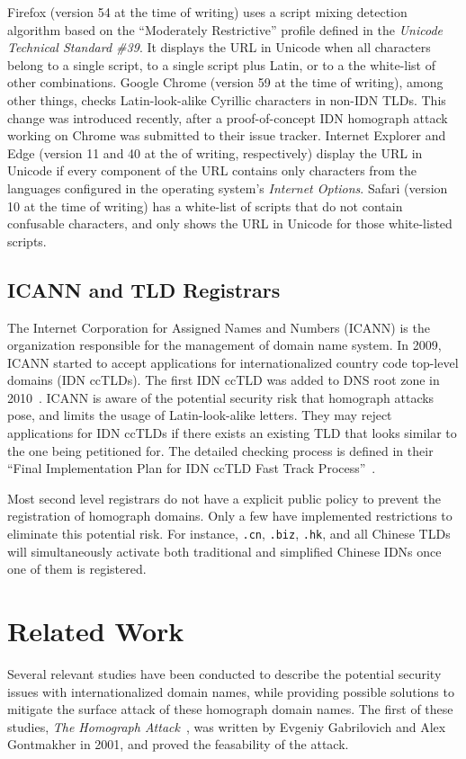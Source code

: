\documentclass[letterpaper,twocolumn,10pt]{article}
\begin{document}
Firefox (version 54 at the time of writing) uses a script mixing detection algorithm based on the ``Moderately Restrictive'' profile defined in the \textit{Unicode Technical Standard \#39}.
It displays the URL in Unicode when all characters belong to a single script, to a single script plus Latin, or to a the white-list of other combinations.
Google Chrome (version 59 at the time of writing), among other things, checks Latin-look-alike Cyrillic characters in non-IDN TLDs.
This change was introduced recently, after a proof-of-concept IDN homograph attack working on Chrome was submitted to their issue tracker.
Internet Explorer and Edge (version 11 and 40 at the of writing, respectively) display the URL in Unicode if every component of the URL contains only characters from the languages configured in the operating system's \textit{Internet Options}.
Safari (version 10 at the time of writing) has a white-list of scripts that do not contain confusable characters, and only shows the URL in Unicode for those white-listed scripts.

\subsection{ICANN and TLD Registrars}
The Internet Corporation for Assigned Names and Numbers (ICANN) is the organization responsible for the management of domain name system.
In 2009, ICANN started to accept applications for internationalized country code top-level domains (IDN ccTLDs).
The first IDN ccTLD was added to DNS root zone in 2010~\cite{mac2010}.
ICANN is aware of the potential security risk that homograph attacks pose, and limits the usage of Latin-look-alike letters.
They may reject applications for IDN ccTLDs if there exists an existing TLD that looks similar to the one being petitioned for.
The detailed checking process is defined in their ``Final Implementation Plan for IDN ccTLD Fast Track Process''~\cite{icann2013}.

Most second level registrars do not have a explicit public policy to prevent the registration of homograph domains.
Only a few have implemented restrictions to eliminate this potential risk.
For instance, \texttt{.cn}, \texttt{.biz}, \texttt{.hk}, and all Chinese TLDs will simultaneously activate both traditional and simplified Chinese IDNs once one of them is registered.

\section{Related Work}
Several relevant studies have been conducted to describe the potential security issues with internationalized domain names, while providing possible solutions to mitigate the surface attack of these homograph domain names. The first of these studies, \textit{The Homograph Attack}~\cite{gabrilovich2002}, was written by Evgeniy Gabrilovich and Alex Gontmakher in 2001, and proved the feasability of the attack.
\end{document}
